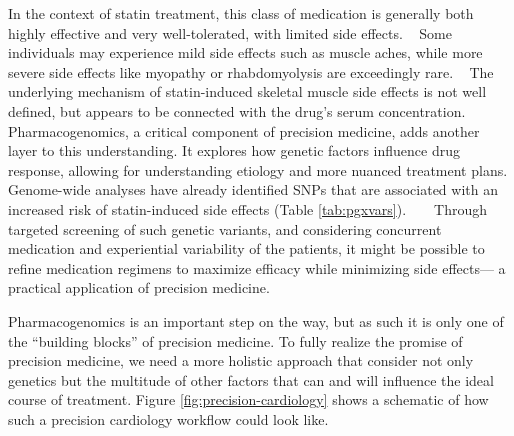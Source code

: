 In the context of statin treatment,
this class of medication is generally both
highly effective and very well-tolerated, with limited side effects.
~\autocite{taylorStatins2013}
Some individuals may experience mild side effects such as muscle aches, 
while more severe side effects like myopathy or rhabdomyolysis 
are exceedingly rare.
~\autocite{thompsonStatinAssociated2003}
The underlying mechanism of 
statin-induced skeletal muscle side effects
is not well defined, 
but appears to be connected with the drug's serum concentration.
~\autocite{thompsonStatinAssociated2003}
Pharmacogenomics, a critical component of precision medicine, 
adds another layer to this understanding. 
It explores how genetic factors influence drug response, 
allowing for understanding etiology and more nuanced treatment plans. 
Genome-wide analyses have already identified \acp{SNP} 
that are associated with an increased risk 
of statin-induced side effects (Table \ref{tab:pgxvars}).
~\autocite{searchcollaborativegroupSLCO1B12008}
~\autocite{thornPharmGKB2013}
Through targeted screening of such genetic variants, 
and considering concurrent medication 
and experiential variability of the patients, 
it might be possible to refine medication regimens 
to maximize efficacy while minimizing side effects---%
a practical application of precision medicine.

Pharmacogenomics is an important step on the way,
but as such it is only one of the \enquote{building blocks} 
of precision medicine.
To fully realize the promise of precision medicine, 
we need a more holistic approach that consider not
only genetics but the multitude of other factors that 
can and will influence the ideal course of treatment.
Figure \ref{fig:precision-cardiology} shows a schematic of 
how such a precision cardiology workflow could look like.

